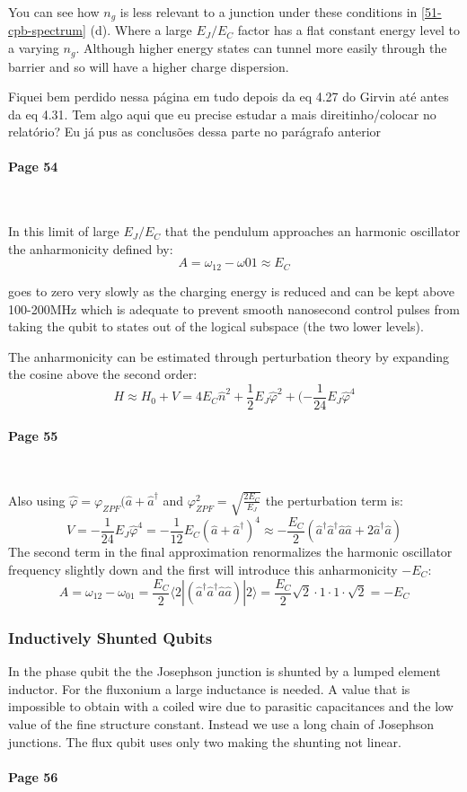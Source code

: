 \documentclass[12pt]{article}
\numberwithin{equation}{subsection}
\newcommand\ask[1]{
{\color{red}
#1
}
}
\newcommand\page[1]{
{
\color{blue}\paragraph{
Page #1
}\mbox{}\\
}
}
\begin{document}
You can see how $n_g$ is less relevant to a junction under these conditions in \ref{51-cpb-spectrum} (d). Where a large $E_J/E_C$ factor has a flat constant energy level to a varying $n_g$. Although higher energy states can tunnel more easily through the barrier and so will have a higher charge dispersion.

\ask{Fiquei bem perdido nessa página em tudo depois da eq 4.27 do Girvin até antes da eq 4.31. Tem algo aqui que eu precise estudar a mais direitinho/colocar no relatório? Eu já pus as conclusões dessa parte no parágrafo anterior}
\page{54}
In this limit of large $E_J/E_C$ that the pendulum approaches an harmonic oscillator the anharmonicity defined by:
\begin{equation}
    A = \omega_{12}-\omega{01} \approx E_C
\end{equation}

goes to zero very slowly as the charging energy is reduced and can be kept above 100-200MHz which is adequate to prevent smooth nanosecond control pulses from taking the qubit to states out of the logical subspace (the two lower levels).

The anharmonicity can be estimated through perturbation theory by expanding the cosine above the second order:
\begin{equation}
   H \approx H_0+V = 4E_C\hat n^2 + \frac{1}{2} E_J \hat \varphi^2  + (-\frac{1}{24} E_J \hat \varphi ^4
\end{equation}

\page{55}
Also using $\hat \varphi = \varphi_{ZPF} (\hat a+ \hat a ^\dagger$ and $\varphi^2_{ZPF}= \sqrt{\frac{2E_C}{E_J}}$ the perturbation term is:
\begin{equation}
    V= -\frac{1}{24}E_J\hat \varphi^4 = -\frac{1}{12}E_C (\hat a + \hat a^\dagger)^4\approx - \frac{E_C}{2} (\hat a^\dagger\hat a^\dagger \hat a\hat a + 2 \hat a^\dagger \hat a)
\end{equation}
The second term in the final approximation renormalizes the harmonic oscillator frequency slightly down and the first will introduce this anharmonicity $-E_C$:
\begin{equation}
    A= \omega _{12} -\omega _{01} = \frac{E_C}{2} \langle 2| (\hat a^\dagger\hat a^\dagger \hat a\hat a)|2\rangle  =  \frac{E_C}{2} \sqrt{2} \cdot 1 \cdot 1 \cdot \sqrt 2 = -E_C
\end{equation}
\subsubsection{Inductively Shunted Qubits}
In the phase qubit the  the Josephson junction is shunted by a lumped element inductor. For the fluxonium a large inductance is needed. A value that is impossible to obtain with a coiled wire due to parasitic capacitances and the low value of the fine structure constant. Instead we use a long chain of Josephson junctions. The flux qubit uses only two making the shunting not linear.
\page{56}
\end{document}
